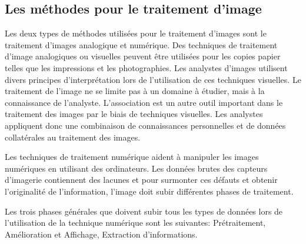 \documentclass[12pt]{article}
\begin{document}
\subsection{Les méthodes pour le traitement d’image}
Les deux types de méthodes utilisées pour le traitement d'images sont le traitement d'images analogique et numérique. Des techniques de traitement d'image analogiques ou visuelles peuvent être utilisées pour les copies papier telles que les impressions et les photographies. Les analystes d'images utilisent divers principes d'interprétation lors de l'utilisation de ces techniques visuelles. Le traitement de l'image ne se limite pas à un domaine à étudier, mais à la connaissance de l'analyste. L'association est un autre outil important dans le traitement des images par le biais de techniques visuelles. Les analystes appliquent donc une combinaison de connaissances personnelles et de données collatérales au traitement des images.

Les techniques de traitement numérique aident à manipuler les images numériques en utilisant des ordinateurs. Les données brutes des capteurs d'imagerie contiennent des lacunes et pour surmonter ces défauts et obtenir l’originalité de l’information, l’image doit subir différentes phases de traitement.

Les trois phases générales que doivent subir tous les types de données lors de l’utilisation de la technique numérique sont les suivantes: Prétraitement, Amélioration et Affichage, Extraction d’informations.
\end{document}
